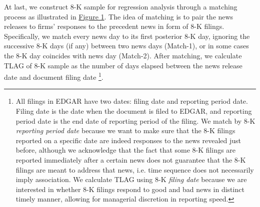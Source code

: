 \documentclass[a4paper]{article}
\begin{document}
\begin{spacing}{2}
At last, we construct 8-K sample for regression analysis through a matching process as illustrated in \hyperref[fig1]{Figure 1}. The idea of matching is to pair the news releases to firms' responses to the precedent news in form of 8-K filings. Specifically, we match every news day to its first posterior 8-K day, ignoring the successive 8-K days (if any) between two news days (Match-1), or in some cases the 8-K day coincides with news day (Match-2). After matching, we calculate TLAG of 8-K sample as the number of days elapsed between the news release date and document filing date \footnote{All filings in EDGAR have two dates: filing date and reporting period date. Filing date is the date when the document is filed to EDGAR, and reporting period date is the end date of reporting period of the filing. We match by 8-K \textit{reporting period date} because we want to make sure that the 8-K filings reported on a specific date are indeed responses to the news revealed just before, although we acknowledge that the fact that some 8-K filings are reported immediately after a certain news does not guarantee that the 8-K filings are meant to address that news, i.e. time sequence does not necessarily imply association. We calculate TLAG using 8-K \textit{filing date} because we are interested in whether 8-K filings respond to good and bad news in distinct timely manner, allowing for managerial discretion in reporting speed.}. 


\end{spacing}
\end{document}
